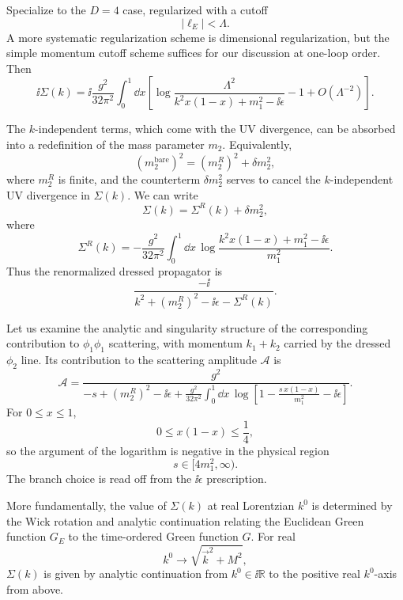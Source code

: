 Specialize to the \(D=4\) case, regularized with a cutoff
\[
  |\ell_E|<\Lambda.
\]
A more systematic regularization scheme is dimensional regularization,
but the simple momentum cutoff scheme suffices for our discussion at
one-loop order.  Then
\[
  \ii\Sigma(k)
  =
  \ii\frac{g^2}{32\pi^2}
  \int_0^1\dd x
  \left[
    \log\frac{\Lambda^2}{k^2x(1-x)+m_1^2-\ii\epsilon}
    -1+O(\Lambda^{-2})
  \right].
\]

The \(k\)-independent terms, which come with the UV divergence, can be
absorbed into a redefinition of the mass parameter \(m_2\).  Equivalently,
\[
  \left(m_2^{\mathrm{bare}}\right)^2
  =
  \left(m_2^R\right)^2+\delta m_2^2,
\]
where \(m_2^R\) is finite, and the counterterm \(\delta m_2^2\) serves
to cancel the \(k\)-independent UV divergence in \(\Sigma(k)\).
We can write
\[
  \Sigma(k)=\Sigma^R(k)+\delta m_2^2,
\]
where
\[
  \Sigma^R(k)
  =
  -\frac{g^2}{32\pi^2}
  \int_0^1\dd x\,
  \log\frac{k^2x(1-x)+m_1^2-\ii\epsilon}{m_1^2}.
\]
Thus the renormalized dressed propagator is
\[
  \frac{-\ii}{k^2+\left(m_2^R\right)^2-\ii\epsilon-\Sigma^R(k)}.
\]

Let us examine the analytic and singularity structure of the corresponding
contribution to \(\phi_1\phi_1\) scattering, with momentum
\(k_1+k_2\) carried by the dressed \(\phi_2\) line.  Its contribution to
the scattering amplitude \(\mathcal A\) is
\[
  \mathcal A
  =
  \frac{g^2}{
    -s+\left(m_2^R\right)^2-\ii\epsilon
    +
    \frac{g^2}{32\pi^2}
    \int_0^1\dd x\,
    \log\left[1-\frac{s\,x(1-x)}{m_1^2}-\ii\epsilon\right]
  }.
\]
For \(0\leq x\leq1\),
\[
  0\leq x(1-x)\leq\frac14,
\]
so the argument of the logarithm is negative in the physical region
\[
  s\in[4m_1^2,\infty).
\]
The branch choice is read off from the \(\ii\epsilon\) prescription.

More fundamentally, the value of \(\Sigma(k)\) at real Lorentzian \(k^0\)
is determined by the Wick rotation and analytic continuation relating
the Euclidean Green function \(G_E\) to the time-ordered Green function
\(G\).  For real
\[
  k^0\to \sqrt{\vec k^2+M^2},
\]
\(\Sigma(k)\) is given by analytic continuation from \(k^0\in \ii\mathbb R\)
to the positive real \(k^0\)-axis from above.


